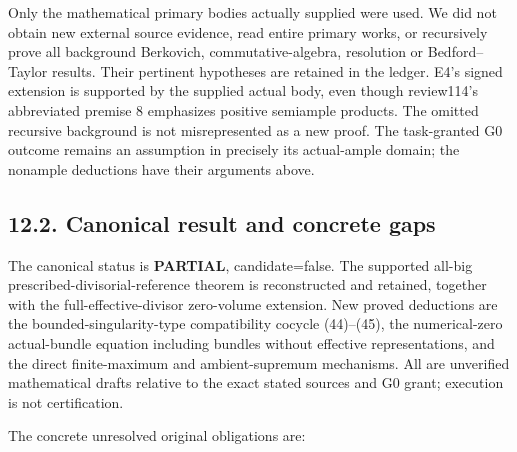 \documentclass[
  10pt,
]{article}
\begin{document}
Only the mathematical primary bodies actually supplied were used. We did
not obtain new external source evidence, read entire primary works, or
recursively prove all background Berkovich, commutative-algebra,
resolution or Bedford--Taylor results. Their pertinent hypotheses are
retained in the ledger. E4's signed extension is supported by the
supplied actual body, even though review114's abbreviated premise 8
emphasizes positive semiample products. The omitted recursive background
is not misrepresented as a new proof. The task-granted G0 outcome
remains an assumption in precisely its actual-ample domain; the nonample
deductions have their arguments above.

\subsection{12.2. Canonical result and concrete
gaps}\label{canonical-result-and-concrete-gaps}

The canonical status is \textbf{PARTIAL}, candidate=false. The supported
all-big prescribed-divisorial-reference theorem is reconstructed and
retained, together with the full-effective-divisor zero-volume
extension. New proved deductions are the bounded-singularity-type
compatibility cocycle (44)--(45), the numerical-zero actual-bundle
equation including bundles without effective representations, and the
direct finite-maximum and ambient-supremum mechanisms. All are
unverified mathematical drafts relative to the exact stated sources and
G0 grant; execution is not certification.

The concrete unresolved original obligations are:
\end{document}
